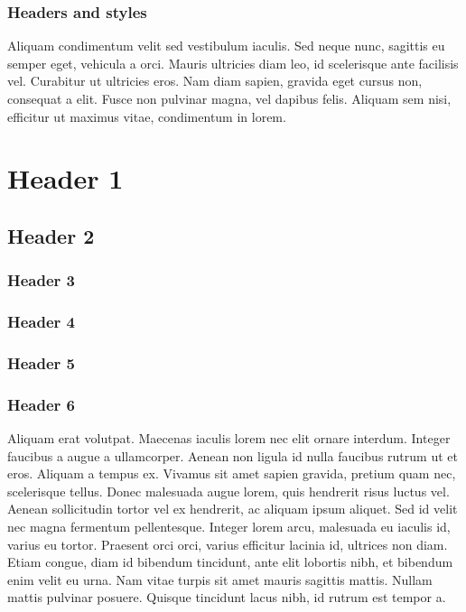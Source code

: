 \documentclass{article}
\begin{document}
\subsubsection{Headers and styles}\label{H2723379}



Aliquam condimentum velit sed vestibulum iaculis. Sed neque nunc, sagittis eu semper eget, vehicula a orci. Mauris ultricies diam leo, id scelerisque ante facilisis vel. Curabitur ut ultricies eros. Nam diam sapien, gravida eget cursus non, consequat a elit. Fusce non pulvinar magna, vel dapibus felis. Aliquam sem nisi, efficitur ut maximus vitae, condimentum in lorem.


\section{Header 1}\label{H5078208}



\subsection{Header 2}\label{H7613580}



\subsubsection{Header 3}\label{H7133996}



\subsubsection{Header 4}\label{H9722296}



\subsubsection{Header 5}\label{H7389617}



\subsubsection{Header 6}\label{H1367103}



Aliquam erat volutpat. Maecenas iaculis lorem nec elit ornare interdum. Integer faucibus a augue a ullamcorper. Aenean non ligula id nulla faucibus rutrum ut et eros. Aliquam a tempus ex. Vivamus sit amet sapien gravida, pretium quam nec, scelerisque tellus. Donec malesuada augue lorem, quis hendrerit risus luctus vel. Aenean sollicitudin tortor vel ex hendrerit, ac aliquam ipsum aliquet. Sed id velit nec magna fermentum pellentesque. Integer lorem arcu, malesuada eu iaculis id, varius eu tortor. Praesent orci orci, varius efficitur lacinia id, ultrices non diam. Etiam congue, diam id bibendum tincidunt, ante elit lobortis nibh, et bibendum enim velit eu urna. Nam vitae turpis sit amet mauris sagittis mattis. Nullam mattis pulvinar posuere. Quisque tincidunt lacus nibh, id rutrum est tempor a.
\end{document}
